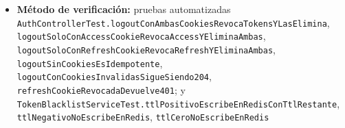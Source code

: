 \documentclass[
  spanish,
]{article}
\providecommand{\tightlist}{%
  \setlength{\itemsep}{0pt}\setlength{\parskip}{0pt}}
\begin{document}
\begin{itemize}
  \begin{enumerate}
  \def\labelenumi{\arabic{enumi}.}
  \tightlist
  \item
    Dado un usuario autenticado con ambas cookies, cuando envía
    \texttt{POST\ /\allowbreak{}api/\allowbreak{}auth/\allowbreak{}logout}, entonces la respuesta es
    \texttt{204\ No\ Content}, se escriben las claves
    \texttt{jwt:blacklist:\textless{}\allowbreak{}jti\textgreater{}} correspondientes
    y ambas cookies se eliminan del cliente.
  \item
    Dado un token cuyo tiempo restante de expiración es positivo, cuando
    se revoca, entonces la clave se escribe con TTL igual a ese tiempo
    restante; si el tiempo restante es cero o negativo, no se escribe
    nada en Redis.
  \item
    Dado un refresh token revocado, cuando se intenta usar en
    \texttt{POST\ /\allowbreak{}api/\allowbreak{}auth/\allowbreak{}refresh}, entonces la respuesta es
    \texttt{401}.
  \item
    El logout es idempotente: sin cookies, o con cookies inválidas, la
    respuesta sigue siendo \texttt{204}.
  \end{enumerate}
\item
  \textbf{Método de verificación:} pruebas automatizadas
  \texttt{Auth\allowbreak{}Controller\allowbreak{}Test.\allowbreak{}logout\allowbreak{}Con\allowbreak{}Ambas\allowbreak{}Cookies\allowbreak{}Revoca\allowbreak{}Tokens\allowbreak{}YLas\allowbreak{}Elimina},
  \texttt{logout\allowbreak{}Solo\allowbreak{}Con\allowbreak{}Access\allowbreak{}Cookie\allowbreak{}Revoca\allowbreak{}Access\allowbreak{}YElimina\allowbreak{}Ambas},
  \texttt{logout\allowbreak{}Solo\allowbreak{}Con\allowbreak{}Refresh\allowbreak{}Cookie\allowbreak{}Revoca\allowbreak{}Refresh\allowbreak{}YElimina\allowbreak{}Ambas},
  \texttt{logout\allowbreak{}Sin\allowbreak{}Cookies\allowbreak{}Es\allowbreak{}Idempotente},
  \texttt{logout\allowbreak{}Con\allowbreak{}Cookies\allowbreak{}Invalidas\allowbreak{}Sigue\allowbreak{}Siendo204},
  \texttt{refresh\allowbreak{}Cookie\allowbreak{}Revocada\allowbreak{}Devuelve401}; y
  \texttt{Token\allowbreak{}Blacklist\allowbreak{}Service\allowbreak{}Test.\allowbreak{}ttl\allowbreak{}Positivo\allowbreak{}Escribe\allowbreak{}En\allowbreak{}Redis\allowbreak{}Con\allowbreak{}Ttl\allowbreak{}Restante},
  \texttt{ttl\allowbreak{}Negativo\allowbreak{}No\allowbreak{}Escribe\allowbreak{}En\allowbreak{}Redis}, \texttt{ttl\allowbreak{}Cero\allowbreak{}No\allowbreak{}Escribe\allowbreak{}En\allowbreak{}Redis}

\end{itemize}
\end{document}
